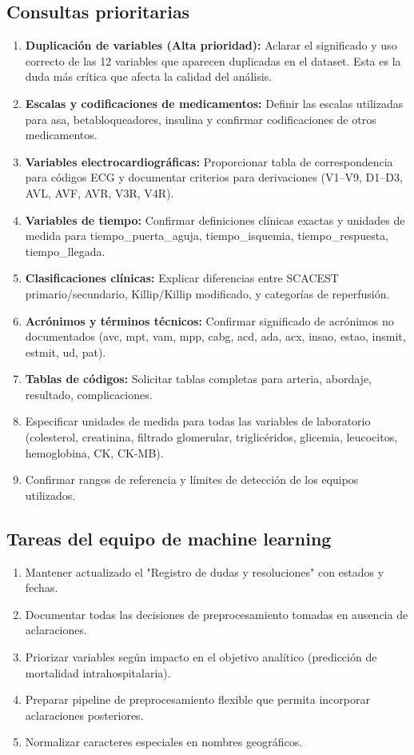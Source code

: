 \documentclass[11pt,a4paper]{article}
\begin{document}
\subsection*{Consultas prioritarias }
\begin{enumerate}
    \item \textbf{Duplicación de variables (Alta prioridad):} Aclarar el significado y uso correcto de las 12 variables que aparecen duplicadas en el dataset. Esta es la duda más crítica que afecta la calidad del análisis.
    \item \textbf{Escalas y codificaciones de medicamentos:} Definir las escalas utilizadas para asa, betabloqueadores, insulina y confirmar codificaciones de otros medicamentos.
    \item \textbf{Variables electrocardiográficas:} Proporcionar tabla de correspondencia para códigos ECG y documentar criterios para derivaciones (V1--V9, D1--D3, AVL, AVF, AVR, V3R, V4R).
    \item \textbf{Variables de tiempo:} Confirmar definiciones clínicas exactas y unidades de medida para tiempo\_puerta\_aguja, tiempo\_isquemia, tiempo\_respuesta, tiempo\_llegada.
    \item \textbf{Clasificaciones clínicas:} Explicar diferencias entre SCACEST primario/secundario, Killip/Killip modificado, y categorías de reperfusión.
    \item \textbf{Acrónimos y términos técnicos:} Confirmar significado de acrónimos no documentados (avc, mpt, vam, mpp, cabg, acd, ada, acx, insao, estao, insmit, estmit, ud, pat).
    \item \textbf{Tablas de códigos:} Solicitar tablas completas para arteria, abordaje, resultado, complicaciones.
    \item Especificar unidades de medida para todas las variables de laboratorio (colesterol, creatinina, filtrado glomerular, triglicéridos, glicemia, leucocitos, hemoglobina, CK, CK-MB).
    \item Confirmar rangos de referencia y límites de detección de los equipos utilizados.
\end{enumerate}



\subsection*{Tareas del equipo de machine learning}
\begin{enumerate}
    \item Mantener actualizado el "Registro de dudas y resoluciones" con estados y fechas.
    \item Documentar todas las decisiones de preprocesamiento tomadas en ausencia de aclaraciones.
    \item Priorizar variables según impacto en el objetivo analítico (predicción de mortalidad intrahospitalaria).
    \item Preparar pipeline de preprocesamiento flexible que permita incorporar aclaraciones posteriores.
    \item Normalizar caracteres especiales en nombres geográficos.
\end{enumerate}
\end{document}
